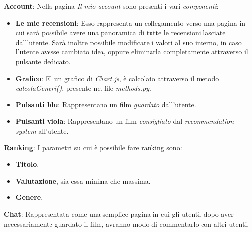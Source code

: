 \documentclass[12pt]{article}
\begin{document}
	\noindent \textbf{Account}: Nella pagina \textit{Il mio account} sono presenti i vari \textit{componenti}:
	\begin{itemize}
		\item \textbf{Le mie recensioni}: Esso rappresenta un collegamento verso una pagina in cui sarà possibile avere una panoramica di tutte le recensioni lasciate dall'utente. Sarà inoltre possibile modificare i valori al suo interno, in caso l'utente avesse cambiato idea, oppure eliminarla completamente attraverso il pulsante dedicato.
		\item \textbf{Grafico}: E' un grafico di \textit{Chart.js}, è calcolato attraverso il metodo \textit{calcolaGeneri()}, presente nel file \textit{methods.py}.
		\item \textbf{Pulsanti blu}: Rappresentano un film \textit{guardato} dall'utente.
		\item \textbf{Pulsanti viola}: Rappresentano un film \textit{consigliato} dal \textit{recommendation system} all'utente.
	\end{itemize}
	
	\noindent \textbf{Ranking}: I parametri su cui è possibile fare ranking sono:
	\begin{itemize}
		\item \textbf{Titolo}.
		\item \textbf{Valutazione}, sia essa minima che massima.
		\item \textbf{Genere}. \\
	\end{itemize}
	
	\noindent \textbf{Chat}: Rappresentata come una semplice pagina in cui gli utenti, dopo aver necessariamente guardato il film, avranno modo di commentarlo con altri utenti.
	
	\pagebreak
	
	
	
\end{document}

